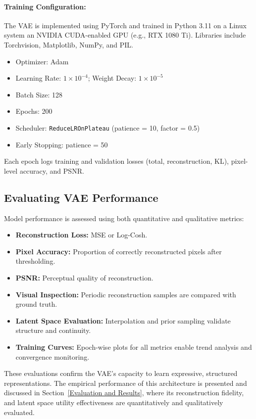 \paragraph{Training Configuration:}
The VAE is implemented using PyTorch and trained in Python 3.11 on a Linux system an NVIDIA CUDA-enabled GPU (e.g., RTX 1080 Ti). Libraries include Torchvision, Matplotlib, NumPy, and PIL.

\begin{itemize}
    \item Optimizer: Adam
    \item Learning Rate: $1 \times 10^{-4}$; Weight Decay: $1 \times 10^{-5}$
    \item Batch Size: 128
    \item Epochs: 200
    \item Scheduler: \texttt{ReduceLROnPlateau} (patience = 10, factor = 0.5)
    \item Early Stopping: patience = 50
\end{itemize}

Each epoch logs training and validation losses (total, reconstruction, KL), pixel-level accuracy, and PSNR.

\subsection{Evaluating VAE Performance} \label{subsec:vae_evaluation}

Model performance is assessed using both quantitative and qualitative metrics:
\begin{itemize}
\item \textbf{Reconstruction Loss:} MSE or Log-Cosh.
\item \textbf{Pixel Accuracy:} Proportion of correctly reconstructed pixels after thresholding.
\item \textbf{PSNR:} Perceptual quality of reconstruction.
\item \textbf{Visual Inspection:} Periodic reconstruction samples are compared with ground truth.
\item \textbf{Latent Space Evaluation:} Interpolation and prior sampling validate structure and continuity.
\item \textbf{Training Curves:} Epoch-wise plots for all metrics enable trend analysis and convergence monitoring.
\end{itemize}

These evaluations confirm the VAE's capacity to learn expressive, structured representations. The empirical performance of this architecture is presented and discussed in Section~\ref{Evaluation and Results}, where its reconstruction fidelity, and latent space utility effectiveness are quantitatively and qualitatively evaluated.



